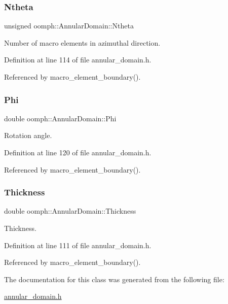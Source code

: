 \subsubsection{\texorpdfstring{Ntheta}{Ntheta}}
{\footnotesize\ttfamily unsigned oomph\+::\+Annular\+Domain\+::\+Ntheta\hspace{0.3cm}{\ttfamily [private]}}



Number of macro elements in azimuthal direction. 



Definition at line 114 of file annular\+\_\+domain.\+h.



Referenced by macro\+\_\+element\+\_\+boundary().

\mbox{\label{classoomph_1_1AnnularDomain_a0280549bd7a88cabb84a7223ed114040}} 
\subsubsection{\texorpdfstring{Phi}{Phi}}
{\footnotesize\ttfamily double oomph\+::\+Annular\+Domain\+::\+Phi\hspace{0.3cm}{\ttfamily [private]}}



Rotation angle. 



Definition at line 120 of file annular\+\_\+domain.\+h.



Referenced by macro\+\_\+element\+\_\+boundary().

\mbox{\label{classoomph_1_1AnnularDomain_a34008644354ffc3e7f48505557d95755}} 
\subsubsection{\texorpdfstring{Thickness}{Thickness}}
{\footnotesize\ttfamily double oomph\+::\+Annular\+Domain\+::\+Thickness\hspace{0.3cm}{\ttfamily [private]}}



Thickness. 



Definition at line 111 of file annular\+\_\+domain.\+h.



Referenced by macro\+\_\+element\+\_\+boundary().



The documentation for this class was generated from the following file\+:\begin{DoxyCompactItemize}
\item 
\hyperlink{annular__domain_8h}{annular\+\_\+domain.\+h}\end{DoxyCompactItemize}
